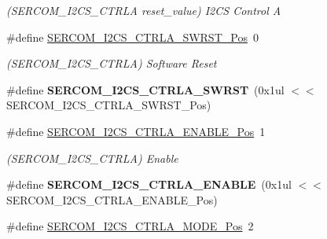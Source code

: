 \begin{DoxyCompactItemize}
\begin{DoxyCompactList}\small\item\em (S\+E\+R\+C\+O\+M\+\_\+\+I2\+C\+S\+\_\+\+C\+T\+R\+L\+A reset\+\_\+value) I2\+C\+S Control A \end{DoxyCompactList}\item 
\hypertarget{group___s_a_m_l21___s_e_r_c_o_m_gabde836e4dd8d6a4f167cd81950e214ea}{}\#define \hyperlink{group___s_a_m_l21___s_e_r_c_o_m_gabde836e4dd8d6a4f167cd81950e214ea}{S\+E\+R\+C\+O\+M\+\_\+\+I2\+C\+S\+\_\+\+C\+T\+R\+L\+A\+\_\+\+S\+W\+R\+S\+T\+\_\+\+Pos}~0\label{group___s_a_m_l21___s_e_r_c_o_m_gabde836e4dd8d6a4f167cd81950e214ea}

\begin{DoxyCompactList}\small\item\em (S\+E\+R\+C\+O\+M\+\_\+\+I2\+C\+S\+\_\+\+C\+T\+R\+L\+A) Software Reset \end{DoxyCompactList}\item 
\hypertarget{group___s_a_m_l21___s_e_r_c_o_m_ga6623f68cf80577001463daa6540328ec}{}\#define {\bfseries S\+E\+R\+C\+O\+M\+\_\+\+I2\+C\+S\+\_\+\+C\+T\+R\+L\+A\+\_\+\+S\+W\+R\+S\+T}~(0x1ul $<$$<$ S\+E\+R\+C\+O\+M\+\_\+\+I2\+C\+S\+\_\+\+C\+T\+R\+L\+A\+\_\+\+S\+W\+R\+S\+T\+\_\+\+Pos)\label{group___s_a_m_l21___s_e_r_c_o_m_ga6623f68cf80577001463daa6540328ec}

\item 
\hypertarget{group___s_a_m_l21___s_e_r_c_o_m_ga38a5f4684c38da4b013c1341846d097f}{}\#define \hyperlink{group___s_a_m_l21___s_e_r_c_o_m_ga38a5f4684c38da4b013c1341846d097f}{S\+E\+R\+C\+O\+M\+\_\+\+I2\+C\+S\+\_\+\+C\+T\+R\+L\+A\+\_\+\+E\+N\+A\+B\+L\+E\+\_\+\+Pos}~1\label{group___s_a_m_l21___s_e_r_c_o_m_ga38a5f4684c38da4b013c1341846d097f}

\begin{DoxyCompactList}\small\item\em (S\+E\+R\+C\+O\+M\+\_\+\+I2\+C\+S\+\_\+\+C\+T\+R\+L\+A) Enable \end{DoxyCompactList}\item 
\hypertarget{group___s_a_m_l21___s_e_r_c_o_m_ga86b9d255545c1aa6df928e178449d68c}{}\#define {\bfseries S\+E\+R\+C\+O\+M\+\_\+\+I2\+C\+S\+\_\+\+C\+T\+R\+L\+A\+\_\+\+E\+N\+A\+B\+L\+E}~(0x1ul $<$$<$ S\+E\+R\+C\+O\+M\+\_\+\+I2\+C\+S\+\_\+\+C\+T\+R\+L\+A\+\_\+\+E\+N\+A\+B\+L\+E\+\_\+\+Pos)\label{group___s_a_m_l21___s_e_r_c_o_m_ga86b9d255545c1aa6df928e178449d68c}

\item 
\hypertarget{group___s_a_m_l21___s_e_r_c_o_m_ga28b25756139973e68744537e28f53c09}{}\#define \hyperlink{group___s_a_m_l21___s_e_r_c_o_m_ga28b25756139973e68744537e28f53c09}{S\+E\+R\+C\+O\+M\+\_\+\+I2\+C\+S\+\_\+\+C\+T\+R\+L\+A\+\_\+\+M\+O\+D\+E\+\_\+\+Pos}~2\label{group___s_a_m_l21___s_e_r_c_o_m_ga28b25756139973e68744537e28f53c09}


\end{DoxyCompactItemize}
